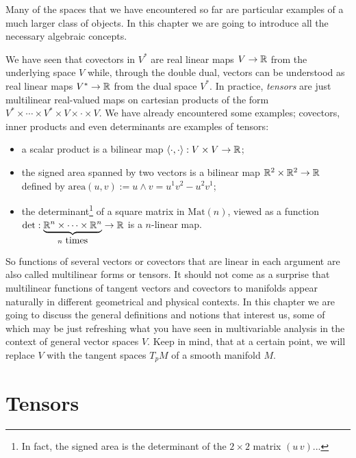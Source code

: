 Many of the spaces that we have encountered so far are particular examples of a much larger class of objects.
In this chapter we are going to introduce all the necessary algebraic concepts.

We have seen that covectors in $V^*$ are real linear maps $V\to\mathbb{R}$ from the underlying space $V$ while, through the double dual, vectors can be understood as real linear maps $V^*\to\mathbb{R}$ from the dual space $V^*$.
In practice, \emph{tensors} are just multilinear real-valued maps on cartesian products of the form $V^*\times \cdots \times V^* \times V \times \cdot \times V$.
We have already encountered some examples; covectors, inner products and even determinants are examples of tensors:
\begin{itemize}
  \item a scalar product is a bilinear map $\langle\cdot,\cdot\rangle:V\times V\to \mathbb{R}$;
  \item the signed area spanned by two vectors is a bilinear map $\mathbb{R}^2\times\mathbb{R}^2\to\mathbb{R}$ defined by $\mathrm{area}(u,v) := u\wedge v = u^1v^2-u^2v^1$;
  \item the determinant\footnote{In fact, the signed area is the determinant of the $2\times 2$ matrix $(u \, v)$...} of a square matrix in $\mathrm{Mat}(n)$, viewed as a function $\det: \LaTeXunderbrace{\R^n\times\cdots\times\R^n}_{n\mbox{ times}}\to\R$ is a $n$-linear map.
\end{itemize}

So functions of several vectors or covectors that are linear in each argument are also called multilinear forms or tensors.
It should not come as a surprise that multilinear functions of tangent vectors and covectors to manifolds appear naturally in different geometrical and physical contexts.
In this chapter we are going to discuss the general definitions and notions that interest us, some of which may be just refreshing what you have seen in multivariable analysis in the context of general vector spaces $V$.
Keep in mind, that at a certain point, we will replace $V$ with the tangent spaces $T_pM$ of a smooth manifold $M$.

\section{Tensors}

